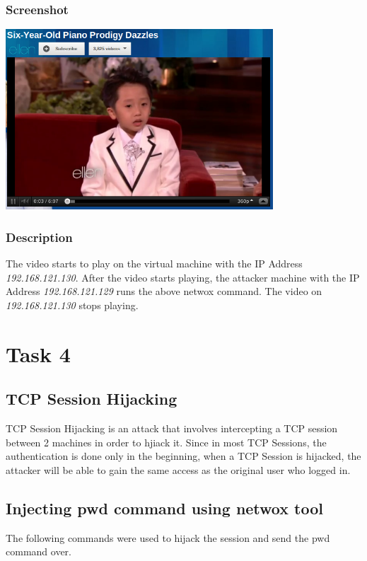 \documentclass[12pt]{article}
\begin{document}
\subsubsection{Screenshot}
\begin{center}
\includegraphics[width=100mm]{task31.png}
\end{center}
\subsubsection{Description}
The video starts to play on the virtual machine with the IP Address \emph{192.168.121.130}. After the video starts playing, the attacker machine with the IP Address \emph{192.168.121.129} runs the above netwox command. The video on \emph{192.168.121.130} stops playing.
\pagebreak

\section{Task 4}
\subsection{TCP Session Hijacking}
TCP Session Hijacking is an attack that involves intercepting a TCP session between 2 machines in order to hjiack it. Since in most TCP Sessions, the authentication is done only in the beginning, when a TCP Session is hijacked, the attacker will be able to gain the same access as the original user who logged in.

\subsection{Injecting pwd command using netwox tool}
The following commands were used to hijack the session and send the pwd command over. \\
\end{document}
